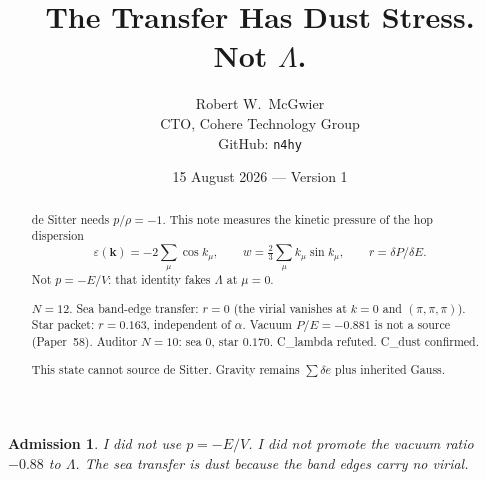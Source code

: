 \documentclass[11pt]{article}
\title{\textbf{The Transfer Has Dust Stress.\\
Not $\Lambda$.}}
\author{Robert W.\ McGwier\\
\small CTO, Cohere Technology Group\\
\small GitHub: \texttt{n4hy}}
\date{15 August 2026 --- Version 1}
\newtheorem*{admission}{Admission}
\begin{document}
\maketitle

\begin{abstract}
\noindent
de Sitter needs $p/\rho=-1$. This note measures the
kinetic pressure of the hop dispersion
\[
\varepsilon(\mathbf{k})=-2\sum_\mu\cos k_\mu,\qquad
w=\tfrac23\sum_\mu k_\mu\sin k_\mu,
\qquad r=\delta P/\delta E.
\]
Not $p=-E/V$: that identity fakes $\Lambda$ at $\mu=0$.

$N=12$. Sea band-edge transfer: $r=0$ (the virial
vanishes at $k=0$ and $(\pi,\pi,\pi)$).
Star packet: $r=0.163$, independent of $\alpha$.
Vacuum $P/E=-0.881$ is not a source (Paper~58).
Auditor $N=10$: sea $0$, star $0.170$.
C\_lambda refuted. C\_dust confirmed.

This state cannot source de Sitter. Gravity remains
$\sum\delta e$ plus inherited Gauss.
\end{abstract}

\begin{admission}
I did not use $p=-E/V$. I did not promote the
vacuum ratio $-0.88$ to $\Lambda$. The sea transfer
is dust because the band edges carry no virial.
\end{admission}
\end{document}
